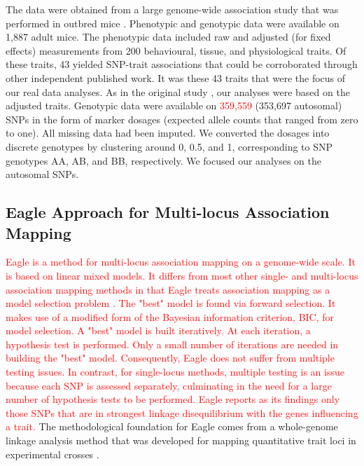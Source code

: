 \documentclass{article}
\begin{document}
The data were obtained from a large genome-wide association study that was performed in outbred mice \citep{nicod2016genome}. 
Phenotypic and genotypic data were available on 1,887 adult mice. 
The phenotypic data included raw and adjusted (for fixed effects) measurements from 200 behavioural, tissue, and physiological traits.  
Of these traits, 
43 yielded SNP-trait associations that could be corroborated through other independent published work. It was these 
43 traits that were the focus of our real data analyses. As in the original study  \citep{nicod2016genome}, our analyses 
were based on the adjusted traits.
Genotypic data were available on \textcolor{red}{359,559} (353,697 autosomal) SNPs in the 
form of marker dosages (expected allele counts that ranged from zero to one). All missing data had been imputed. 
We converted the dosages into discrete genotypes 
by clustering around 0, 0.5, and 1, corresponding to SNP genotypes AA, AB, and BB, respectively. 
We focused our analyses on the autosomal SNPs.




\subsection{Eagle Approach for Multi-locus Association Mapping}
\label{subsection:Eagle}

\textcolor{red}{
Eagle is a method for multi-locus association mapping on a genome-wide scale. It is based on linear mixed models. It differs from most other single- and multi-locus association mapping methods in that Eagle treats association mapping as a model selection problem \citep{ball2001bayesian,broman2002model,yi2005bayesian}. 
The "best" model is found via forward selection. It makes use of a modified form of the Bayesian information criterion, BIC, for model selection.
A "best" model is built iteratively. At each iteration, a hypothesis test is performed. 
Only a small number of iterations are needed in building the "best" model.  Consequently, 
Eagle does not suffer from multiple testing issues.
In contrast,  for single-locus methods, multiple testing is an 
issue because each SNP is assessed separately, culminating in the need for a large number of hypothesis tests to be  performed. 
Eagle 
reports as its findings only those SNPs that are in strongest linkage disequilibrium with  the genes influencing a trait. }
The methodological foundation for Eagle comes from a whole-genome linkage analysis method that was developed for mapping 
quantitative trait loci in experimental crosses \citep{verbyla2007analysis}.
\end{document}
